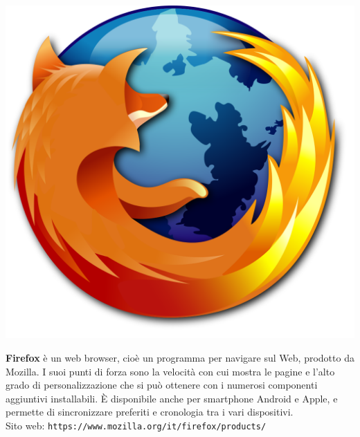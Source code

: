 \documentclass[a4paper, 12pt]{extarticle}
\begin{document}
\begin{minipage}{.2\linewidth}
    \includegraphics[width=.9\linewidth]{img/opuscolo-8.png}
\end{minipage}
\begin{minipage}{.75\linewidth}
\textbf{Firefox} è un web browser, cioè un programma per navigare sul
Web, prodotto da Mozilla. I suoi punti di forza sono la velocità con
cui mostra le pagine e l'alto grado di personalizzazione che si può
ottenere con i numerosi componenti aggiuntivi installabili. È
disponibile anche per smartphone Android e Apple, e permette di
sincronizzare preferiti e cronologia tra i vari dispositivi.\\
Sito web: \texttt{https://www.mozilla.org/it/firefox/products/}
\end{minipage}
\end{document}
